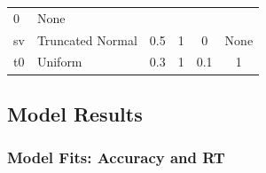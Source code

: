 \documentclass[11pt,]{article}
\begin{document}
\begin{longtable}[]{@{}llcccc@{}}
\begin{minipage}[t]{0.09\columnwidth}
0\strut
\end{minipage} & \begin{minipage}[t]{0.09\columnwidth}\centering\strut
None\strut
\end{minipage}\tabularnewline
\begin{minipage}[t]{0.28\columnwidth}\raggedright\strut
sv\strut
\end{minipage} & \begin{minipage}[t]{0.20\columnwidth}\raggedright\strut
Truncated Normal\strut
\end{minipage} & \begin{minipage}[t]{0.08\columnwidth}\centering\strut
0.5\strut
\end{minipage} & \begin{minipage}[t]{0.06\columnwidth}\centering\strut
1\strut
\end{minipage} & \begin{minipage}[t]{0.09\columnwidth}\centering\strut
0\strut
\end{minipage} & \begin{minipage}[t]{0.09\columnwidth}\centering\strut
None\strut
\end{minipage}\tabularnewline
\begin{minipage}[t]{0.28\columnwidth}\raggedright\strut
t0\strut
\end{minipage} & \begin{minipage}[t]{0.20\columnwidth}\raggedright\strut
Uniform\strut
\end{minipage} & \begin{minipage}[t]{0.08\columnwidth}\centering\strut
0.3\strut
\end{minipage} & \begin{minipage}[t]{0.06\columnwidth}\centering\strut
1\strut
\end{minipage} & \begin{minipage}[t]{0.09\columnwidth}\centering\strut
0.1\strut
\end{minipage} & \begin{minipage}[t]{0.09\columnwidth}\centering\strut
1\strut
\end{minipage}\tabularnewline
\bottomrule
\end{longtable}

\subsection{Model Results}\label{model-results}

\subsubsection{Model Fits: Accuracy and
RT}\label{model-fits-accuracy-and-rt}
\end{document}
